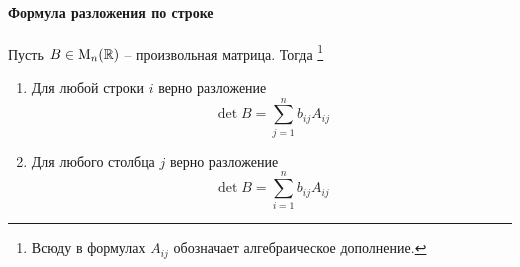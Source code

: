 \paragraph{Формула разложения по строке}

\begin{claim}
\label{claim::DetExpand}
Пусть $B\in\operatorname{M}_{n}(\mathbb R)$ -- произвольная матрица.
Тогда%
\footnote{Всюду в формулах $A_{ij}$ обозначает алгебраическое дополнение.}
\begin{enumerate}
\item Для любой строки $i$ верно разложение
\[
\det B = \sum_{j=1}^n b_{ij} A_{ij}
\]

\item Для любого столбца $j$ верно разложение
\[
\det B = \sum_{i=1}^n b_{ij} A_{ij}
\]
\end{enumerate}
\end{claim}
